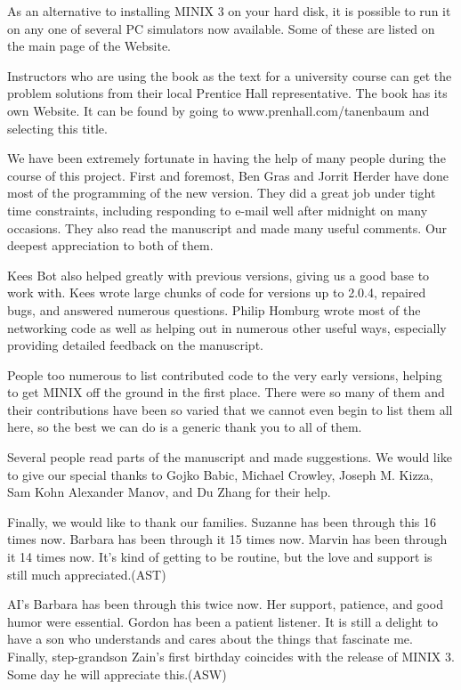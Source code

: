 \documentclass{book}
\begin{document}
As an alternative to installing MINIX 3 on your hard disk, it is possible to run it on any one of several PC simulators now available.
Some of these are listed on the main page of the Website.

Instructors who are using the book as the text for a university course can get the problem solutions from their local Prentice Hall representative. 
The book has its own Website.
It can be found by going to www.prenhall.com/tanenbaum and selecting this title.

We have been extremely fortunate in having the help of many people during the course of this project.
First and foremost, Ben Gras and Jorrit Herder have done most of the programming of the new version.
They did a great job under tight time constraints, including responding to e-mail well after midnight on many occasions. 
They also read the manuscript and made many useful comments.
Our deepest appreciation to both of them.

Kees Bot also helped greatly with previous versions, giving us a good base to work with.
Kees wrote large chunks of code for versions up to 2.0.4, repaired bugs, and answered numerous questions.
Philip Homburg wrote most of the networking code as well as helping out in numerous other useful ways, 
especially providing detailed feedback on the manuscript.

People too numerous to list contributed code to the very early versions, helping to get MINIX off the ground in the first place.
There were so many of them and their contributions have been so varied that we cannot even begin to list them all here,
so the best we can do is a generic thank you to all of them.

Several people read parts of the manuscript and made suggestions.
We would like to give our special thanks to Gojko Babic, Michael Crowley, Joseph M. Kizza, Sam Kohn Alexander Manov, and Du Zhang for their help.

Finally, we would like to thank our families. 
Suzanne has been through this 16 times now. 
Barbara has been through it 15 times now.
Marvin has been through it 14 times now.
It's kind of getting to be routine, but the love and support is still much appreciated.(AST)

AI's Barbara has been through this twice now.
Her support, patience, and good humor were essential.
Gordon has been a patient listener.
It is still a delight to have a son who understands and cares about the things that fascinate me.
Finally, step-grandson Zain's first birthday coincides with the release of MINIX 3.
Some day he will appreciate this.(ASW)
\end{document}
